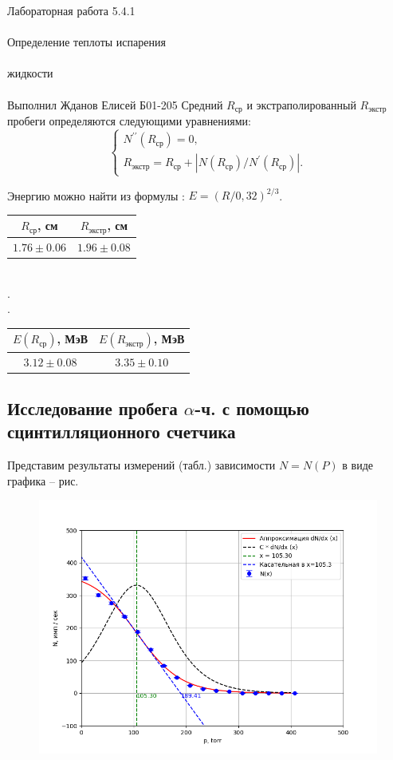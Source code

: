 \documentclass{astroedu-lab}
\begin{document}
\begin{problem}{\huge Лабораторная работа 5.4.1\\\\Определение теплоты испарения\\\\жидкости\\\\Выполнил Жданов Елисей Б01-205}
		Средний $R_\text{ср}$ и экстраполированный $R_\text{экстр}$ пробеги определяются следующими уравнениями:
		\begin{equation*}
			\begin{cases}
				N^{\prime \prime} (R_\text{ср}) = 0, \\
				R_\text{экстр} = R_\text{ср} + \left|N(R_\text{ср})/N^\prime(R_\text{ср})\right|.
			\end{cases}
		\end{equation*}
	
		Энергию можно найти из формулы : $E = \left(R/0,32\right)^{2/3}$.
	\\
			\begin{table}[h!]
			\centering
				{\begin{tabular}{|c|c|}
						\hline
						$R_\text{ср}$, см & $R_\text{экстр}$, см \\ \hline
						$1.76 \pm 0.06 $   & $1.96 \pm 0.08$       \\ \hline
				\end{tabular}}
				\\.\\.\\
				{\begin{tabular}{|c|c|}
						\hline
						$E(R_\text{ср})$, МэВ & $E(R_\text{экстр})$, МэВ \\ \hline
						$3.12 \pm 0.08 $     & $3.35 \pm 0.10 $        \\ \hline
				\end{tabular}}     
		\end{table}
	
	
		\newpage
		\subsection{Исследование пробега $\alpha$-ч. с помощью сцинтилляционного счетчика}	
		Представим результаты измерений (табл.) зависимости $N=N(P)$ в виде графика -- рис. 
		
		\begin{figure}[h!]
		\centering
		\includegraphics[scale=0.5]{Figure_2.png}  
		\end{figure}
		

\end{problem}
\end{document}
